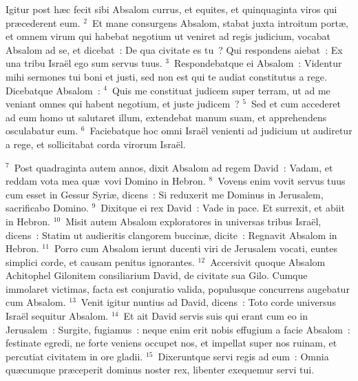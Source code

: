 \lettrine[lines=3,image=true,loversize=0.05,lraise=-0.03]{I}{}gitur post h\ae c fecit sibi Absalom currus, et equites, et quinquaginta viros qui pr\ae cederent eum.
${}^{2}$~Et mane consurgens Absalom, stabat juxta introitum port\ae , et omnem virum qui habebat negotium ut veniret ad regis judicium, vocabat Absalom ad se, et dicebat~: De qua civitate es tu~? Qui respondens aiebat~: Ex una tribu Isra\"el ego sum servus tuus.
${}^{3}$~Respondebatque ei Absalom~: Videntur mihi sermones tui boni et justi, sed non est qui te audiat constitutus a rege. Dicebatque Absalom~:
${}^{4}$~Quis me constituat judicem super terram, ut ad me veniant omnes qui habent negotium, et juste judicem~?
${}^{5}$~Sed et cum accederet ad eum homo ut salutaret illum, extendebat manum suam, et apprehendens osculabatur eum.
${}^{6}$~Faciebatque hoc omni Isra\"el venienti ad judicium ut audiretur a rege, et sollicitabat corda virorum Isra\"el.


${}^{7}$~Post quadraginta autem annos, dixit Absalom ad regem David~: Vadam, et reddam vota mea qu\ae\ vovi Domino in Hebron.
${}^{8}$~Vovens enim vovit servus tuus cum esset in Gessur Syri\ae , dicens~: Si reduxerit me Dominus in Jerusalem, sacrificabo Domino.
${}^{9}$~Dixitque ei rex David~: Vade in pace. Et surrexit, et abiit in Hebron.
${}^{10}$~Misit autem Absalom exploratores in universas tribus Isra\"el, dicens~: Statim ut audieritis clangorem buccin\ae , dicite~: Regnavit Absalom in Hebron.
${}^{11}$~Porro cum Absalom ierunt ducenti viri de Jerusalem vocati, euntes simplici corde, et causam penitus ignorantes.
${}^{12}$~Accersivit quoque Absalom Achitophel Gilonitem consiliarium David, de civitate sua Gilo. Cumque immolaret victimas, facta est conjuratio valida, populusque concurrens augebatur cum Absalom.
${}^{13}$~Venit igitur nuntius ad David, dicens~: Toto corde universus Isra\"el sequitur Absalom.
${}^{14}$~Et ait David servis suis qui erant cum eo in Jerusalem~: Surgite, fugiamus~: neque enim erit nobis effugium a facie Absalom~: festinate egredi, ne forte veniens occupet nos, et impellat super nos ruinam, et percutiat civitatem in ore gladii.
${}^{15}$~Dixeruntque servi regis ad eum~: Omnia qu\ae cumque pr\ae ceperit dominus noster rex, libenter exequemur servi tui.


